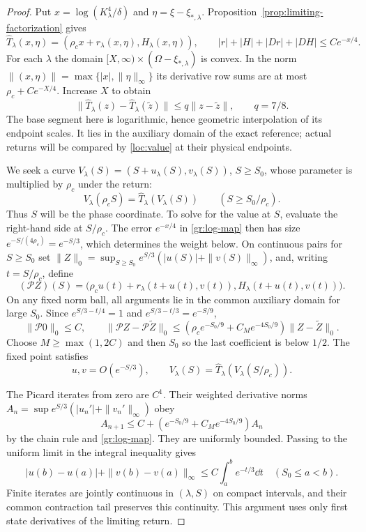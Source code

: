 \begin{proof}
Put $x=\log(K_\lambda^4/\delta)$ and
$\eta=\xi-\xi_{*,\lambda}$. Proposition~\ref{prop:limiting-factorization} gives
\begin{equation}
 \widehat T_\lambda(x,\eta)
  =(\rho_c x+r_\lambda(x,\eta),H_\lambda(x,\eta)),\qquad
 |r|+|H|+|Dr|+|DH|\le Ce^{-x/4}.
 \label{gr:log-map}
\end{equation}
For each $\lambda$ the domain
$[X,\infty)\times(\Omega-\xi_{*,\lambda})$ is convex. In the norm
$\|(x,\eta)\|=\max\{|x|,\|\eta\|_\infty\}$ its derivative row
sums are at most $\rho_c+Ce^{-X/4}$. Increase $X$ to obtain
\begin{equation}
 \|\widehat T_\lambda(z)-\widehat T_\lambda(\widetilde z)\|
       \le q\|z-\widetilde z\|,\qquad q=7/8.
 \label{gr:contraction}
\end{equation}
The base segment here is logarithmic, hence geometric interpolation
of its endpoint scales. It lies in the auxiliary domain of the exact
reference; actual returns will be compared by
\eqref{loc:value} at their physical endpoints.

We seek a curve $V_\lambda(S)=(S+u_\lambda(S),v_\lambda(S))$,
$S\ge S_0$, whose parameter is multiplied by $\rho_c$ under the return:
\[
 V_\lambda(\rho_c S)=\widehat T_\lambda(V_\lambda(S))
 \qquad(S\ge S_0/\rho_c).
\]
Thus $S$ will be the phase coordinate. To solve for the value at $S$,
evaluate the right-hand side at $S/\rho_c$. The error
$e^{-x/4}$ in \eqref{gr:log-map} then has size
$e^{-S/(4\rho_c)}=e^{-S/3}$, which determines the weight below.
On continuous pairs for $S\ge S_0$ set
$\|Z\|_0=\sup_{S\ge S_0}e^{S/3}(|u(S)|+\|v(S)\|_\infty)$,
and, writing $t=S/\rho_c$, define
\[
 (\mathcal PZ)(S)=
 \bigl(\rho_c u(t)+r_\lambda(t+u(t),v(t)),
                 H_\lambda(t+u(t),v(t))\bigr).
\]
On any fixed norm ball, all arguments lie in the common auxiliary
domain for large $S_0$. Since
$e^{S/3-t/4}=1$ and $e^{S/3-t/3}=e^{-S/9}$,
\[
 \|\mathcal P0\|_0\le C,\qquad
 \|\mathcal PZ-\mathcal P\widetilde Z\|_0
 \le(\rho_c e^{-S_0/9}+C_Me^{-4S_0/9})
                       \|Z-\widetilde Z\|_0.
\]
Choose $M\ge\max(1,2C)$ and then $S_0$ so the last coefficient
is below $1/2$. The fixed point satisfies
\begin{equation}
 u,v=O(e^{-S/3}),\qquad
 V_\lambda(S)=\widehat T_\lambda(V_\lambda(S/\rho_c)).
 \label{gr:parametrized-graph}
\end{equation}

The Picard iterates from zero are $C^1$. Their weighted derivative
norms $A_n=\sup e^{S/3}(|u_n'|+\|v_n'\|_\infty)$ obey
\[
 A_{n+1}\le C+(e^{-S_0/9}+C_Me^{-4S_0/9})A_n
\]
by the chain rule and \eqref{gr:log-map}. They are uniformly bounded.
Passing to the uniform limit in the integral inequality gives
\begin{equation}
 |u(b)-u(a)|+\|v(b)-v(a)\|_\infty
       \le C\int_a^b e^{-t/3}\dd t\quad(S_0\le a<b).
 \label{gr:weighted-Lipschitz}
\end{equation}
Finite iterates are jointly continuous in $(\lambda,S)$ on compact
intervals, and their common contraction tail preserves this continuity.
This argument uses only first state derivatives of the limiting return.


\end{proof}
